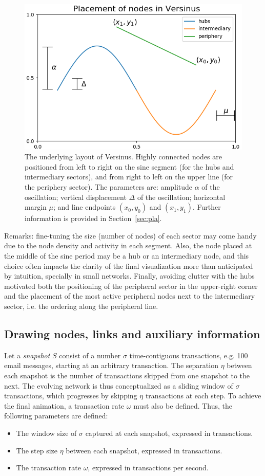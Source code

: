 \documentclass[runningheads]{llncs}
\begin{document}
\begin{figure}[!h]\centering
\includegraphics[width=.7\textwidth]{nodePositioning}
  \caption{The underlying layout of Versinus. Highly connected nodes are positioned from left to right on the sine segment (for the hubs and intermediary sectors), and from right to left on the upper line (for the periphery sector). The parameters are: amplitude $\alpha$ of the oscillation; vertical displacement $\Delta$ of the oscillation; horizontal margin $\mu$; and line endpoints $(x_0, y_0)$ and $(x_1, y_1)$.
   Further information is provided in Section~\ref{sec:pla}.
  }\label{fig:glob}
\end{figure}

\noindent Remarks: fine-tuning the size (number of nodes) of each sector may come handy due to the node density and activity in each segment. Also, the node placed at the middle of the sine period may be a hub or an intermediary node, and this choice often impacts the clarity of the final visualization more than anticipated by intuition, specially in small networks.
Finally, avoiding clutter with the hubs motivated both 
the positioning of the peripheral sector in the upper-right corner and
the placement of the most active peripheral nodes next to the intermediary sector, i.e. the ordering along the peripheral line.

\subsection{Drawing nodes, links and auxiliary information}
Let a \emph{snapshot} $S$ consist of a number $\sigma$ time-contiguous transactions, e.g. 100 email messages, starting at an arbitrary transaction.
The separation $\eta$ between each snapshot is the number of transactions skipped from one snapshot to the next.
The evolving network is thus conceptualized as a sliding window of $\sigma$ transactions, which progresses by skipping $\eta$ transactions at each step.
To achieve the final animation, a transaction rate $\omega$ must also be defined.
Thus, the following parameters are defined:
\begin{itemize}
  \item The window size of $\sigma$ captured at each snapshot, expressed in transactions.
  \item The step size $\eta$ between each snapshot, expressed in transactions.
  \item The transaction rate $\omega$, expressed in transactions per second.
\end{itemize}
\end{document}
